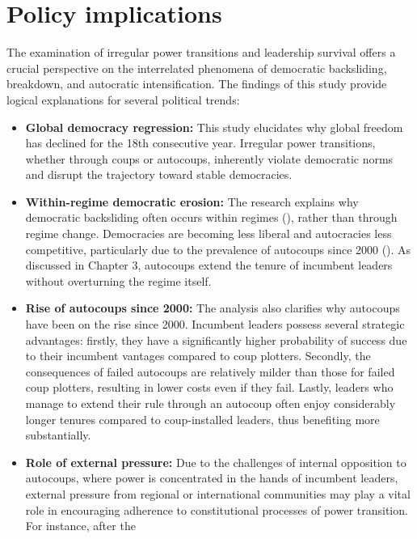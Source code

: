 \documentclass[
  12pt,
]{report}
\begin{document}
\section{Policy implications}\label{policy-implications-1}

The examination of irregular power transitions and leadership survival
offers a crucial perspective on the interrelated phenomena of democratic
backsliding, breakdown, and autocratic intensification. The findings of
this study provide logical explanations for several political trends:

\begin{itemize}
\item
  \textbf{Global democracy regression:} This study elucidates why global
  freedom has declined for the 18th consecutive year. Irregular power
  transitions, whether through coups or autocoups, inherently violate
  democratic norms and disrupt the trajectory toward stable democracies.
\item
  \textbf{Within-regime democratic erosion:} The research explains why
  democratic backsliding often occurs within regimes
  (),
  rather than through regime change. Democracies are becoming less
  liberal and autocracies less competitive, particularly due to the
  prevalence of autocoups since 2000 (). As discussed in Chapter 3, autocoups extend the tenure of
  incumbent leaders without overturning the regime itself.
\item
  \textbf{Rise of autocoups since 2000:} The analysis also clarifies why
  autocoups have been on the rise since 2000. Incumbent leaders possess
  several strategic advantages: firstly, they have a significantly
  higher probability of success due to their incumbent vantages compared
  to coup plotters. Secondly, the consequences of failed autocoups are
  relatively milder than those for failed coup plotters, resulting in
  lower costs even if they fail. Lastly, leaders who manage to extend
  their rule through an autocoup often enjoy considerably longer tenures
  compared to coup-installed leaders, thus benefiting more
  substantially.
\item
  \textbf{Role of external pressure:} Due to the challenges of internal
  opposition to autocoups, where power is concentrated in the hands of
  incumbent leaders, external pressure from regional or international
  communities may play a vital role in encouraging adherence to
  constitutional processes of power transition. For instance, after the

\end{itemize}
\end{document}
